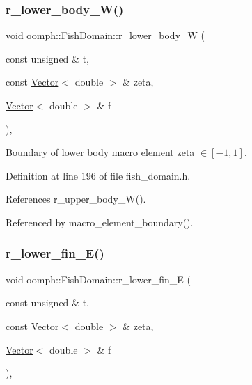 \subsubsection{\texorpdfstring{r\+\_\+lower\+\_\+body\+\_\+\+W()}{r\_lower\_body\_W()}}
{\footnotesize\ttfamily void oomph\+::\+Fish\+Domain\+::r\+\_\+lower\+\_\+body\+\_\+W (\begin{DoxyParamCaption}\item[{const unsigned \&}]{t,  }\item[{const \hyperlink{classoomph_1_1Vector}{Vector}$<$ double $>$ \&}]{zeta,  }\item[{\hyperlink{classoomph_1_1Vector}{Vector}$<$ double $>$ \&}]{f }\end{DoxyParamCaption})\hspace{0.3cm}{\ttfamily [inline]}, {\ttfamily [private]}}



Boundary of lower body macro element zeta $ \in [-1,1] $. 



Definition at line 196 of file fish\+\_\+domain.\+h.



References r\+\_\+upper\+\_\+body\+\_\+\+W().



Referenced by macro\+\_\+element\+\_\+boundary().

\mbox{\label{classoomph_1_1FishDomain_a956dcbb87e9b37a0b965fcddb9911de3}} 
\subsubsection{\texorpdfstring{r\+\_\+lower\+\_\+fin\+\_\+\+E()}{r\_lower\_fin\_E()}}
{\footnotesize\ttfamily void oomph\+::\+Fish\+Domain\+::r\+\_\+lower\+\_\+fin\+\_\+E (\begin{DoxyParamCaption}\item[{const unsigned \&}]{t,  }\item[{const \hyperlink{classoomph_1_1Vector}{Vector}$<$ double $>$ \&}]{zeta,  }\item[{\hyperlink{classoomph_1_1Vector}{Vector}$<$ double $>$ \&}]{f }\end{DoxyParamCaption})\hspace{0.3cm}{\ttfamily [inline]}, {\ttfamily [private]}}



